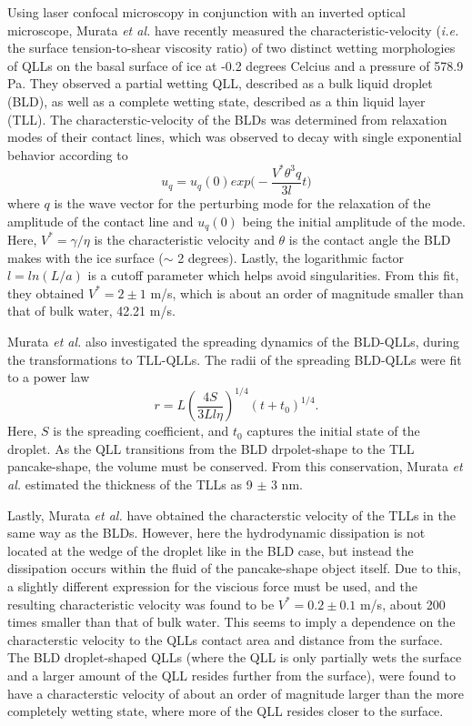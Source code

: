 Using laser confocal microscopy in conjunction with an inverted
optical microscope, Murata \textit{et al.} have recently measured the
characteristic-velocity (\textit{i.e.} the surface tension-to-shear
viscosity ratio) of two distinct wetting morphologies of QLLs on the
basal surface of ice at -0.2 degrees Celcius and a pressure of 578.9
Pa.\cite{Murata2015} They observed a partial wetting QLL, described as
a bulk liquid droplet (BLD), as well as a complete wetting state,
described as a thin liquid layer (TLL). The characterstic-velocity of
the BLDs was determined from relaxation modes of their contact lines,
which was observed to decay with single exponential behavior according
to
\begin{equation}
u_q = u_q(0) exp\Bigg(-\frac{V^* \theta^3 q}{3l}t\Bigg)
\end{equation}
where $q$ is the wave vector for the perturbing mode for the
relaxation of the amplitude of the contact line and $u_q(0)$ being the
initial amplitude of the mode. Here, $V^* = \gamma / \eta$ is the
characteristic velocity and $\theta$ is the contact angle the BLD makes
with the ice surface ($\sim$ 2 degrees). Lastly, the logarithmic factor
$l=ln(L/a)$ is a cutoff parameter which helps avoid
singularities. From this fit, they obtained $V^* = 2 \pm 1$ m/s, which
is about an order of magnitude smaller than that of bulk water, 42.21
m/s.

Murata \textit{et al.} also investigated the spreading dynamics of the
BLD-QLLs, during the transformations to TLL-QLLs. The radii of the
spreading BLD-QLLs were fit to a power law
\begin{equation}
r = L (\frac{4S}{3Ll \eta})^{1/4}(t+t_0)^{1/4}.
\end{equation}
Here, $S$ is the spreading coefficient, and $t_0$ captures the initial
state of the droplet. As the QLL transitions from the BLD
drpolet-shape to the TLL pancake-shape, the volume must be
conserved. From this conservation, Murata \textit{et al.} estimated
the thickness of the TLLs as 9 $\pm$ 3 nm.

Lastly, Murata \textit{et al.} have obtained the characterstic
velocity of the TLLs in the same way as the BLDs. However, here the
hydrodynamic dissipation is not located at the wedge of the droplet
like in the BLD case, but instead the dissipation occurs within the
fluid of the pancake-shape object itself. Due to this, a slightly
different expression for the viscious force must be used, and the
resulting characteristic velocity was found to be $V^* = 0.2 \pm 0.1$
m/s, about 200 times smaller than that of bulk water. This seems to
imply a dependence on the characterstic velocity to the QLLs contact
area and distance from the surface. The BLD droplet-shaped QLLs (where
the QLL is only partially wets the surface and a larger amount of the
QLL resides further from the surface), were found to have a
characterstic velocity of about an order of magnitude larger than the
more completely wetting state, where more of the QLL resides closer to
the surface.

